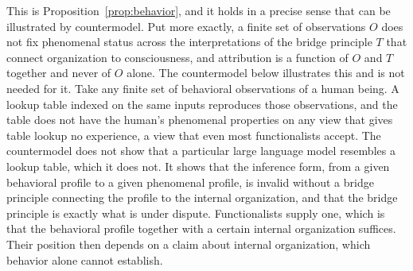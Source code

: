 \documentclass[12pt]{article}
\theoremstyle{definition}
\begin{document}
This is Proposition~\ref{prop:behavior}, and it holds in a precise sense that can be illustrated by countermodel. Put more exactly, a finite set of observations $O$ does not fix phenomenal status across the interpretations of the bridge principle $T$ that connect organization to consciousness, and attribution is a function of $O$ and $T$ together and never of $O$ alone. The countermodel below illustrates this and is not needed for it. Take any finite set of behavioral observations of a human being. A lookup table indexed on the same inputs reproduces those observations, and the table does not have the human's phenomenal properties on any view that gives table lookup no experience, a view that even most functionalists accept. The countermodel does not show that a particular large language model resembles a lookup table, which it does not. It shows that the inference form, from a given behavioral profile to a given phenomenal profile, is invalid without a bridge principle connecting the profile to the internal organization, and that the bridge principle is exactly what is under dispute. Functionalists supply one, which is that the behavioral profile together with a certain internal organization suffices. Their position then depends on a claim about internal organization, which behavior alone cannot establish.
\end{document}
